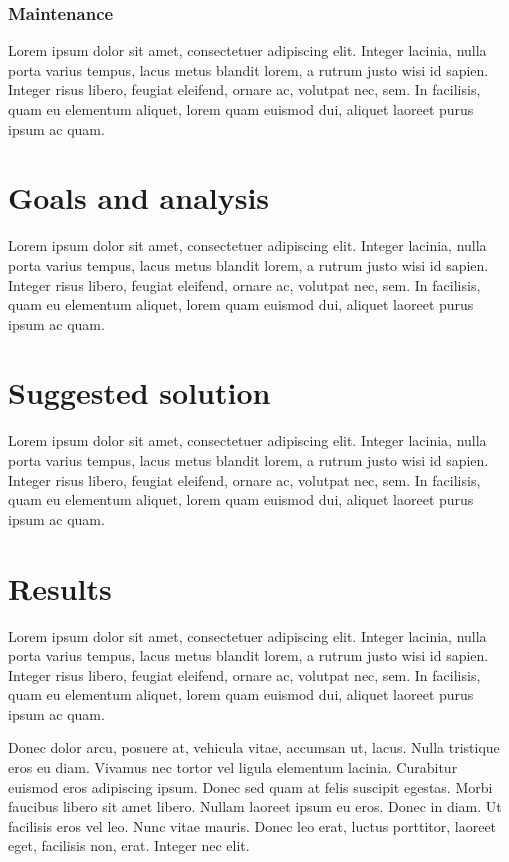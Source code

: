 \documentclass[thesismargins, english, thesislinespacing, twoside, openright, upjsfrontpage]{rnthesis}
\begin{document}
\subsection{Maintenance}

Lorem ipsum dolor sit amet, consectetuer adipiscing elit.
Integer lacinia, nulla porta varius tempus, lacus metus blandit
lorem, a rutrum justo wisi id sapien. Integer risus libero,
feugiat eleifend, ornare ac, volutpat nec, sem. In facilisis,
quam eu elementum aliquet, lorem quam euismod dui, aliquet
laoreet purus ipsum ac quam.

\chapter{Goals and analysis}

Lorem ipsum dolor sit amet, consectetuer adipiscing elit.
Integer lacinia, nulla porta varius tempus, lacus metus blandit
lorem, a rutrum justo wisi id sapien. Integer risus libero,
feugiat eleifend, ornare ac, volutpat nec, sem. In facilisis,
quam eu elementum aliquet, lorem quam euismod dui, aliquet
laoreet purus ipsum ac quam.

\chapter{Suggested solution}

Lorem ipsum dolor sit amet, consectetuer adipiscing elit.
Integer lacinia, nulla porta varius tempus, lacus metus blandit
lorem, a rutrum justo wisi id sapien. Integer risus libero,
feugiat eleifend, ornare ac, volutpat nec, sem. In facilisis,
quam eu elementum aliquet, lorem quam euismod dui, aliquet
laoreet purus ipsum ac quam.

\chapter{Results}

Lorem ipsum dolor sit amet, consectetuer adipiscing elit.
Integer lacinia, nulla porta varius tempus, lacus metus blandit
lorem, a rutrum justo wisi id sapien. Integer risus libero,
feugiat eleifend, ornare ac, volutpat nec, sem. In facilisis,
quam eu elementum aliquet, lorem quam euismod dui, aliquet
laoreet purus ipsum ac quam.

Donec dolor arcu, posuere at, vehicula vitae, accumsan ut,
lacus. Nulla tristique eros eu diam. Vivamus nec tortor vel
ligula elementum lacinia. Curabitur euismod eros adipiscing
ipsum. Donec sed quam at felis suscipit egestas. Morbi faucibus
libero sit amet libero. Nullam laoreet ipsum eu eros. Donec in
diam. Ut facilisis eros vel leo. Nunc vitae mauris. Donec leo
erat, luctus porttitor, laoreet eget, facilisis non, erat.
Integer nec elit.
\end{document}
